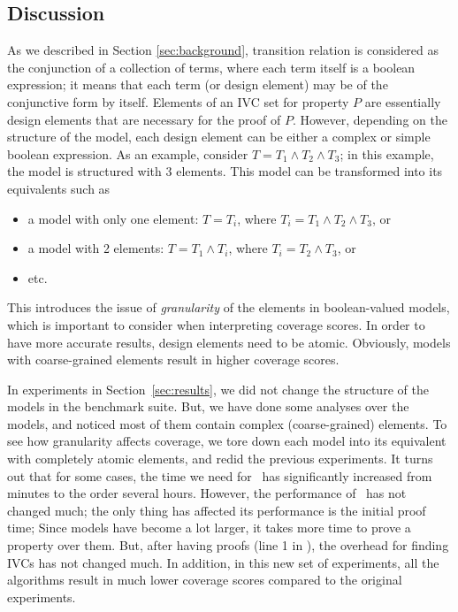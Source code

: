 \subsection{Discussion}
\label{sec:discussion}

As we described in Section \ref{sec:background}, transition relation is considered 
as the conjunction of a collection of terms, where each term itself is a 
boolean expression; it means that each term (or design element) may be of the conjunctive form by itself. 
Elements of an IVC set for property $P$ are essentially design elements that are necessary for the proof of $P$. However, depending on the structure of the model, each design element can be either a complex or simple boolean expression.
As an example, consider $T = T_1 \wedge T_2 \wedge T_3$; in this example, the model is structured with 3 elements. This model can be transformed into its equivalents such as
\begin{itemize}
  \item a model with only one element: $T = T_i$, where $T_i = T_1 \wedge T_2 \wedge T_3$, or
  \item a model with 2 elements: $T = T_1 \wedge T_i$, where $T_i = T_2 \wedge T_3$, or
  \item etc.
\end{itemize}
This introduces the issue of \emph{granularity} of the elements in boolean-valued models, which is important to consider when interpreting coverage scores.
In order to have more accurate results, design elements need to be atomic. 
Obviously, models with coarse-grained elements result in higher coverage scores. 

In experiments in Section~\ref{sec:results}, we did not change the structure of the models in the benchmark suite.
But, we have done some analyses over the models, and noticed most of 
them contain complex (coarse-grained) elements. 
To see how granularity affects coverage, we tore down each model into its equivalent 
with completely atomic elements, and redid the previous experiments.
It turns out that for some cases, the time we need for \nondetcov\ has significantly increased from minutes to the order several hours. However, the performance of \ivccov\ has not changed much; the only thing
has affected its performance is the initial proof time; 
Since models have become a lot larger, it takes more time to prove a property over them. 
But, after having proofs (line 1 in \ucalg), the overhead for finding IVCs has not changed much. In addition, in this new set of experiments, all the algorithms result in much lower coverage scores compared to the original experiments. 